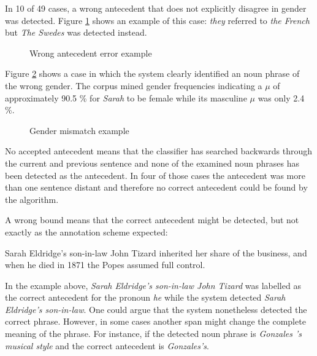 In 10 of 49 cases, a wrong antecedent that does not explicitly disagree in gender was detected. Figure \ref{figure:wrongAnteError} shows an example of this case: \textit{they} referred to \textit{the French} but \textit{The Swedes} was detected instead. 

\begin{figure}[h]
\centering
\caption{Wrong antecedent error example}
	\label{figure:wrongAnteError}
\end{figure}

Figure \ref{figure:wrongGenderError} shows a case in which the system clearly identified an noun phrase of the wrong gender. The corpus mined gender frequencies indicating a $\mu$  of approximately 90.5 \% for \textit{Sarah} to be female while its masculine $\mu$ was only 2.4 \%.

\begin{figure}[h]
\centering
\caption{Gender mismatch example}
	\label{figure:wrongGenderError}
\end{figure}

No accepted antecedent means that the classifier has searched backwards through the current and previous sentence and none of the examined noun phrases has been detected as the antecedent. In four of those cases the antecedent was more than one sentence distant and therefore no correct antecedent could be found by the algorithm. 

A wrong bound means that the correct antecedent might be detected, but not exactly as the annotation scheme expected:
\begin{addmargin}[25pt]{25pt}
Sarah Eldridge's son-in-law John Tizard inherited her share of the business, and when he died in 1871 the Popes assumed full control.
\end{addmargin}
In the example above, \textit{Sarah Eldridge's son-in-law John Tizard} was labelled as the correct antecedent for the pronoun \textit{he} while the system detected \textit{Sarah Eldridge's son-in-law}. One could argue that the system nonetheless detected the correct phrase. However, in some cases another span might change the complete meaning of the phrase. For instance,  if the detected noun phrase is \textit{Gonzales 's musical style} and the correct antecedent is \textit{Gonzales's}.

